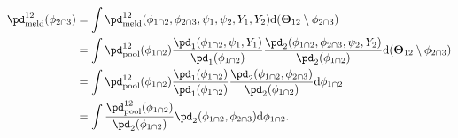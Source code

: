 \begin{align}
  \pd_{\text{meld}}^{12}(\phi_{2 \cap 3}) &=
  \int 
    \pd_{\text{meld}}^{12} (\phi_{1 \cap 2}, \phi_{2 \cap 3}, \psi_{1}, \psi_{2}, Y_{1}, Y_{2}) 
  \text{d} (\boldsymbol{\Theta}_{12} \setminus \phi_{2 \cap 3})
  \\
  &= 
  \int
    \pd_{\text{pool}}^{12}(\phi_{1 \cap 2})
    \frac {
      \pd_{1}(\phi_{1 \cap 2}, \psi_{1}, Y_{1})
    } {
      \pd_{1}(\phi_{1 \cap 2})
    }
    \frac {
      \pd_{2}(\phi_{1 \cap 2}, \phi_{2 \cap 3}, \psi_{2}, Y_{2})
    } {
      \pd_{2}(\phi_{1 \cap 2})
    }
  \text{d} (\boldsymbol{\Theta}_{12} \setminus \phi_{2 \cap 3})
  \\
  &=
  \int
    \pd_{\text{pool}}^{12}(\phi_{1 \cap 2})
    \frac {
      \pd_{1}(\phi_{1 \cap 2})
    } {
      \pd_{1}(\phi_{1 \cap 2})
    }
    \frac {
      \pd_{2}(\phi_{1 \cap 2}, \phi_{2 \cap 3})
    } {
      \pd_{2}(\phi_{1 \cap 2})
    }
  \text{d} \phi_{1 \cap 2} \\
  &= 
  \int
    \frac {
      \pd_{\text{pool}}^{12}(\phi_{1 \cap 2})
    } {
      \pd_{2}(\phi_{1 \cap 2})
    }
      \pd_{2}(\phi_{1 \cap 2}, \phi_{2 \cap 3})
  \text{d} \phi_{1 \cap 2}.
  \label{eqn:verify-dictatorial-pooling}
\end{align}